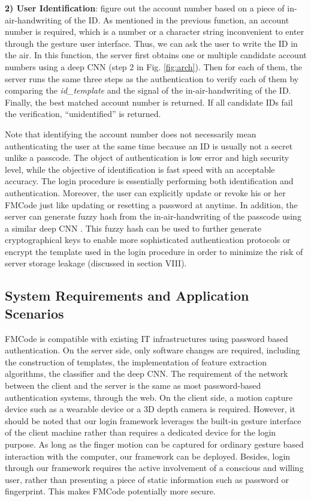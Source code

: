 \documentclass[conference]{IEEEtran}
\begin{document}
\textbf{2) User Identification}: figure out the account number based on a piece of in-air-handwriting of the ID. As mentioned in the previous function, an account number is required, which is a number or a character string inconvenient to enter through the gesture user interface. Thus, we can ask the user to write the ID in the air. In this function, the server first obtains one or multiple candidate account numbers using a deep CNN (step 2 in Fig. \ref{fig:arch}). Then for each of them, the server runs the same three steps as the authentication to verify each of them by comparing the \textit{id\_template} and the signal of the in-air-handwriting of the ID. Finally, the best matched account number is returned. If all candidate IDs fail the verification, ``unidentified'' is returned. 

Note that identifying the account number does not necessarily mean authenticating the user at the same time because an ID is usually not a secret unlike a passcode. The object of authentication is low error and high security level, while the objective of identification is fast speed with an acceptable accuracy. The login procedure is essentially performing both identification and authentication.  Moreover, the user can explicitly update or revoke his or her FMCode just like updating or resetting a password at anytime. In addition, the server can generate fuzzy hash from the in-air-handwriting of the passcode using a similar deep CNN \cite{FMHash}. This fuzzy hash can be used to further generate cryptographical keys to enable more sophisticated authentication protocols or encrypt the template used in the login procedure in order to minimize the risk of server storage leakage (discussed in section VIII). 


\subsection{System Requirements and Application Scenarios}

FMCode is compatible with existing IT infrastructures using password based authentication. On the server side, only software changes are required, including the construction of templates, the implementation of feature extraction algorithms, the classifier and the deep CNN. The requirement of the network between the client and the server is the same as most password-based authentication systems, through the web. On the client side, a motion capture device such as a wearable device or a 3D depth camera is required. However, it should be noted that our login framework leverages the built-in gesture interface of the client machine rather than requires a dedicated device for the login purpose. As long as the finger motion can be captured for ordinary gesture based interaction with the computer, our framework can be deployed. Besides, login through our framework requires the active involvement of a conscious and willing user, rather than presenting a piece of static information such as password or fingerprint. This makes FMCode potentially more secure.  
\end{document}
